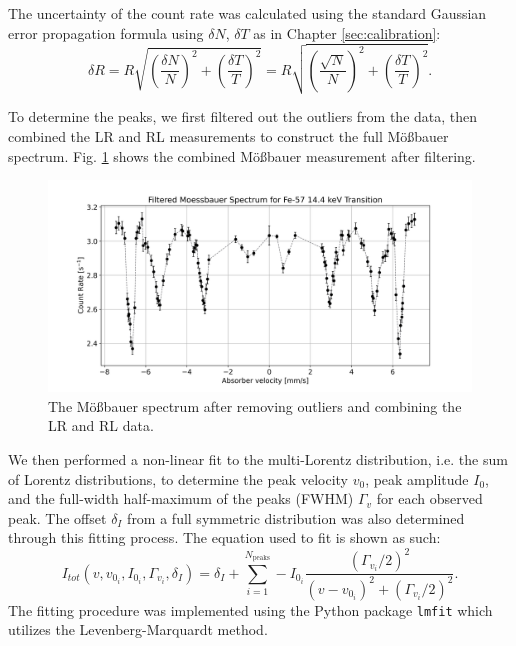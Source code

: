 \documentclass[a4paper]{report}
\numberwithin{equation}{section}
\begin{document}
The uncertainty of the count rate was calculated using the standard Gaussian error propagation formula using $\delta N$, $\delta T$ 
as in Chapter \ref{sec:calibration}:
\begin{equation}
	\delta R = R \sqrt{\left(\frac{\delta N}{N}\right)^2 + \left(\frac{\delta T}{T}\right)^2} = R \sqrt{\left(\frac{\sqrt{N}}{N}\right)^2 + \left(\frac{\delta T}{T}\right)^2} .
\end{equation} \par 


To determine the peaks, we first filtered out the outliers from the data, then combined the LR and RL measurements to construct 
the full M\"o{\ss}bauer spectrum. Fig. \ref{fig:moess_spect_filt} shows the combined M\"o{\ss}bauer measurement after filtering. \par 

\begin{figure}[htb!]
	\centering
	\includegraphics[width=0.8\columnwidth]{moess_spect_filt.png}
	\caption{The M\"o{\ss}bauer spectrum after removing outliers and combining the LR and RL data.}
	\label{fig:moess_spect_filt}
\end{figure}


We then performed a non-linear fit to the multi-Lorentz distribution, i.e. the sum of Lorentz
distributions, to determine the peak velocity $v_0$, peak amplitude $I_0$, and the full-width half-maximum of the peaks (FWHM) $\Gamma_v$ for each observed peak. The 
offset $\delta_I$ from a full symmetric distribution was also determined through this fitting process. The equation used to fit
is shown as such:
\begin{equation}
    I_{tot}(v, v_{0_i}, I_{0_i}, \Gamma_{v_i}, \delta_I) = \delta_I + \sum \limits_{i=1}^{N_{\mathrm{peaks}}} - I_{0_i} \frac{(\Gamma_{v_i} / 2)^2}{(v - v_{0_i})^2 + (\Gamma_{v_i} / 2)^2}.
    \label{eq:multi_lorentzian}
\end{equation}
The fitting procedure was implemented using the Python package \texttt{lmfit} which utilizes the Levenberg-Marquardt method. 
\end{document}
